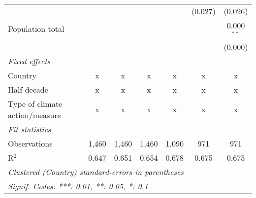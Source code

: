 \begin{tabular}{lcccccc}
                                                                                &         &               &                &                & (0.027)        & (0.026)\\   
   Population total                                                             &         &               &                &                &                & 0.000$^{**}$\\   
                                                                                &         &               &                &                &                & (0.000)\\   
   \emph{Fixed effects}\\
   Country                                                                      & x       & x             & x              & x              & x              & x\\  
   Half decade                                                                  & x       & x             & x              & x              & x              & x\\  
   Type of climate action/measure                                               & x       & x             & x              & x              & x              & x\\  
   \midrule \emph{Fit statistics}\\
   Observations                                                                 & 1,460   & 1,460         & 1,460          & 1,090          & 971            & 971\\  
   R$^2$                                                                        & 0.647   & 0.651         & 0.654          & 0.678          & 0.675          & 0.675\\  
   \midrule
   \multicolumn{7}{l}{\emph{Clustered (Country) standard-errors in parentheses}}\\
   \multicolumn{7}{l}{\emph{Signif. Codes: ***: 0.01, **: 0.05, *: 0.1}}\\
\end{tabular}
\par\endgroup


